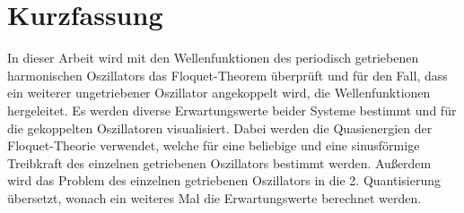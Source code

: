 \thispagestyle{plain}
\iffalse
\section*{Kurzfassung}
Hier steht eine Kurzfassung der Arbeit in deutscher Sprache inklusive der Zusammenfassung der
Ergebnisse.
Zusammen mit der englischen Zusammenfassung muss sie auf diese Seite passen.

\section*{Abstract}
\begin{english}
The abstract is a short summary of the thesis in English, together with the German summary it has to fit on this page.
\end{english}
\fi

\section*{Kurzfassung}
In dieser Arbeit wird mit den Wellenfunktionen des periodisch getriebenen harmonischen Oszillators das Floquet-Theorem überprüft und für den Fall, dass ein weiterer ungetriebener Oszillator angekoppelt wird, die Wellenfunktionen hergeleitet.
Es werden diverse Erwartungswerte beider Systeme bestimmt und für die gekoppelten Oszillatoren visualisiert.
Dabei werden die Quasienergien der Floquet-Theorie verwendet, welche für eine beliebige und eine sinusförmige Treibkraft des einzelnen getriebenen Oszillators bestimmt werden.
Außerdem wird das Problem des einzelnen getriebenen Oszillators in die 2. Quantisierung übersetzt, wonach ein weiteres Mal die Erwartungswerte berechnet werden.

